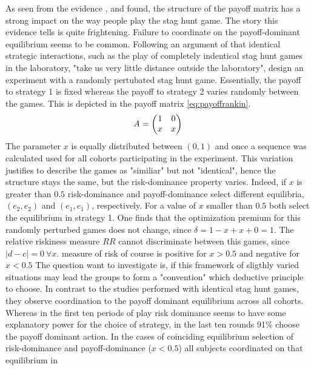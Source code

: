 \documentclass[11pt]{article}
\begin{document}
As seen from the evidence \textcite{battalio_optimization_2001},
\textcite{schmidt_playing_2003} and \textcite{dubois_optimization_2012} 
found, the structure of the payoff matrix has a strong impact on the way 
people play the stag hunt game.   
The story this evidence tells is quite frightening. Failure to coordinate 
on the payoff-dominant equilibrium seems to be common. 
Following an argument of \textcite{kreps_game_1990} that identical strategic 
interactions, such as the play of completely indentical stag hunt games in the 
laboratory, "take us very little distance outside the laboratory", 
\textcite{rankin_strategic_2000} design an experiment with a randomly 
pertubated stag hunt game. Essentially, the payoff to strategy 1 is fixed 
whereas the payoff to strategy 2 varies randomly between the games. This is
depicted in the payoff matrix \eqref{eq:payoffrankin}.
\begin{align}
        \label{eq:payoffrankin}
        A = \mqty(1 & 0 \\ x & x)
\end{align}        
The parameter $x$ is equally distributed between $(0,1)$ and once a sequence
was calculated used for all cohorts participating in the experiment. This
variation justifies to describe the games as "similiar" but not
"identical", hence the structure stays the same, but the risk-dominance 
property varies. Indeed, if $x$ is greater than $0.5$ risk-dominance and
payoff-dominance select different equilibria, $(e_2,e_2)$ and $(e_1,e_1)$,
respectively. For a value of $x$ smaller than $0.5$ both select 
the equilibrium in strategy 1. One finds that the optimization premium for 
this randomly perturbed games does not change, since $\delta=1-x+x+0=1$. 
The relative riskiness measure $RR$ cannot discriminate between this games,
since $|d-c|=0\ \forall x$. \cite{schmidt_playing_2003} measure of risk of 
course is positive for $x > 0.5$ and negative for $x <0.5$
The question \textcite{rankin_strategic_2000}
want to investigate is, if this framework of sligthly varied situations may
lead the groups to form a "convention" which deductive principle to choose. 
In contrast to the studies performed with identical stag hunt games, they 
observe coordination to the payoff dominant equilibrium across
all cohorts. Whereas in the first ten periods of play risk dominance seems
to have some explanatory power for the choice of strategy, in the last ten
rounds 91\% choose the payoff dominant action. 
In the cases of coinciding equilibrium selection of risk-dominance and 
payoff-dominance ($x < 0.5$) all subjects coordinated on that equilibrium in 
\end{document}
